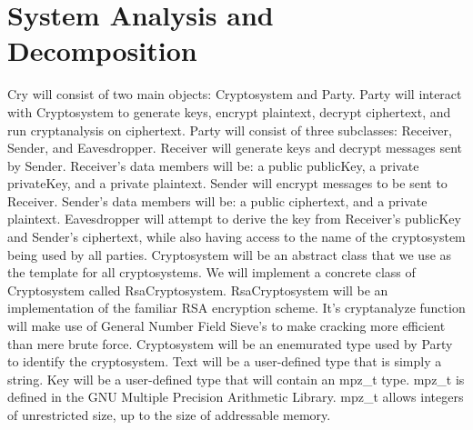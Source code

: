 \section{System Analysis and Decomposition}


Cry will consist of two main objects: Cryptosystem and
Party. Party will interact with Cryptosystem to generate
keys, encrypt plaintext, decrypt ciphertext, and run
cryptanalysis on ciphertext.
\smallskip
Party will consist of three subclasses: Receiver, Sender,
and Eavesdropper. Receiver will generate keys and decrypt
messages sent by Sender. Receiver's data members will be:
a public publicKey, a private privateKey, and a private
plaintext. Sender will encrypt messages to be sent to
Receiver. Sender's data members will be: a public
ciphertext, and a private plaintext. Eavesdropper will
attempt to derive the key from Receiver's publicKey and
Sender's ciphertext, while also having access to the name
of the cryptosystem being used by all parties.
\smallskip
Cryptosystem will be an abstract class that we use as the
template for all cryptosystems.
\smallskip
We will implement a concrete class of Cryptosystem called
RsaCryptosystem. RsaCryptosystem will be an implementation
of the familiar RSA encryption scheme. It's cryptanalyze
function will make use of General Number Field Sieve's to
make cracking more efficient than mere brute force.
\smallskip
Cryptosystem will be an enemurated type used by Party to
identify the cryptosystem.
\smallskip
Text will be a user-defined type that is simply a string.
\smallskip
Key will be a user-defined type that will contain an
mpz\_t type. mpz\_t is defined in the GNU Multiple Precision
Arithmetic Library. mpz\_t allows integers of unrestricted
size, up to the size of addressable memory.
